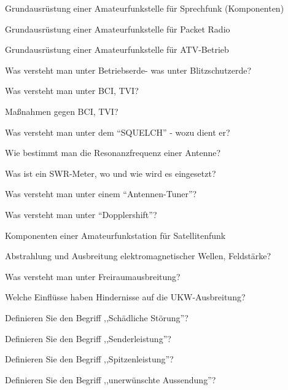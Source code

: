 \documentclass[avery5371,grid,frame,a4paper]{flashcards}
\newcommand\question[2]{
  \begin{flashcard}[{\chap} -- #1]{#2}\end{flashcard}
}
\begin{document}
\question{38}{Grundausrüstung einer Amateurfunkstelle für Sprechfunk (Komponenten)}
\question{39}{Grundausrüstung einer Amateurfunkstelle für Packet Radio}
\question{40}{Grundausrüstung einer Amateurfunkstelle für ATV-Betrieb}
\question{41}{Was versteht man unter Betriebserde- was unter Blitzschutzerde?}
\question{42}{Was versteht man unter BCI, TVI?}
\question{43}{Maßnahmen gegen BCI, TVI?}
\question{44}{Was versteht man unter dem ``SQUELCH'' - wozu dient er?}
\question{45}{Wie bestimmt man die Resonanzfrequenz einer Antenne?}
\question{46}{Was ist ein SWR-Meter, wo und wie wird es eingesetzt?}
\question{47}{Was versteht man unter einem ``Antennen-Tuner''?}
\question{48}{Was versteht man unter ``Dopplershift''?}
\question{49}{Komponenten einer Amateurfunkstation für Satellitenfunk}
\question{50}{Abstrahlung und Ausbreitung elektromagnetischer Wellen, Feldstärke?}
\question{51}{Was versteht man unter Freiraumausbreitung?}
\question{52}{Welche Einflüsse haben Hindernisse auf die UKW-Ausbreitung?}
\question{53}{Definieren Sie den Begriff ,,Schädliche Störung''?}
\question{54}{Definieren Sie den Begriff ,,Senderleistung''?}
\question{55}{Definieren Sie den Begriff ,,Spitzenleistung''?}
\question{56}{Definieren Sie den Begriff ,,unerwünschte Aussendung''?}
\end{document}
